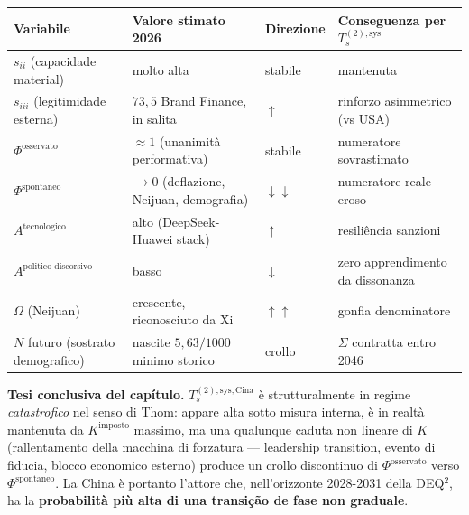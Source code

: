 {\def\LTcaptype{none} %
{\small\begin{longtable}[]{@{}
  >{\raggedright\arraybackslash}p{}
  >{\raggedright\arraybackslash}p{}
  >{\raggedright\arraybackslash}p{}
  >{\raggedright\arraybackslash}p{}@{}}
\toprule\noalign{}
\begin{minipage}[b]{\linewidth}\raggedright
Variabile
\end{minipage} & \begin{minipage}[b]{\linewidth}\raggedright
Valore stimato 2026
\end{minipage} & \begin{minipage}[b]{\linewidth}\raggedright
Direzione
\end{minipage} & \begin{minipage}[b]{\linewidth}\raggedright
Conseguenza per \(T_s^{(2),\text{sys}}\)
\end{minipage} \\
\midrule\noalign{}
\endhead
\bottomrule\noalign{}
\endlastfoot
\(s_{ii}\) (capacidade material) & molto alta & stabile & mantenuta \\
\(s_{iii}\) (legitimidade esterna) & \(73{,}5\) Brand Finance, in salita
& \(\uparrow\) & rinforzo asimmetrico (vs USA) \\
\(\Phi^{\text{osservato}}\) & \(\approx 1\) (unanimità performativa) &
stabile & numeratore sovrastimato \\
\(\Phi^{\text{spontaneo}}\) & \(\to 0\) (deflazione, Neijuan,
demografia) & \(\downarrow\downarrow\) & numeratore reale eroso \\
\(A^{\text{tecnologico}}\) & alto (DeepSeek-Huawei stack) & \(\uparrow\)
& resiliência sanzioni \\
\(A^{\text{politico-discorsivo}}\) & basso & \(\downarrow\) & zero
apprendimento da dissonanza \\
\(\Omega\) (Neijuan) & crescente, riconosciuto da Xi &
\(\uparrow\uparrow\) & gonfia denominatore \\
\(N\) futuro (sostrato demografico) & nascite \(5{,}63/1000\) minimo
storico & crollo & \(\Sigma\) contratta entro 2046 \\
\end{longtable}}
}

\Hypoth{} \textbf{Tesi conclusiva del capítulo.}
\(T_s^{(2),\text{sys},\text{Cina}}\) è strutturalmente in regime
\emph{catastrofico} nel senso di Thom: appare alta sotto misura interna,
è in realtà mantenuta da \(K^{\text{imposto}}\) massimo, ma una
qualunque caduta non lineare di \(K\) (rallentamento della macchina di
forzatura --- leadership transition, evento di fiducia, blocco economico
esterno) produce un crollo discontinuo di \(\Phi^{\text{osservato}}\)
verso \(\Phi^{\text{spontaneo}}\). La China è portanto l'attore che,
nell'orizzonte 2028-2031 della DEQ$^2$, ha la \textbf{probabilità più alta
di una transição de fase non graduale}.

